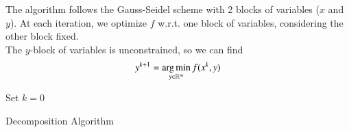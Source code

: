 The algorithm follows the Gauss-Seidel scheme with 2 blocks of variables ($x$ and $y$). At each iteration, we optimize $f$ w.r.t. one block of variables, considering the other block fixed. \\
The $y$-block of variables is unconstrained, so we can find
\begin{equation}\label{eq:updatey}
y^{k+1} = \operatorname*{arg\,min}_{y \in \mathbb{R}^m} f(x^{k},y)
\end{equation}

\begin{algorithm}
 Set $k = 0$\\
 \caption{Decomposition Algorithm}
\end{algorithm}
